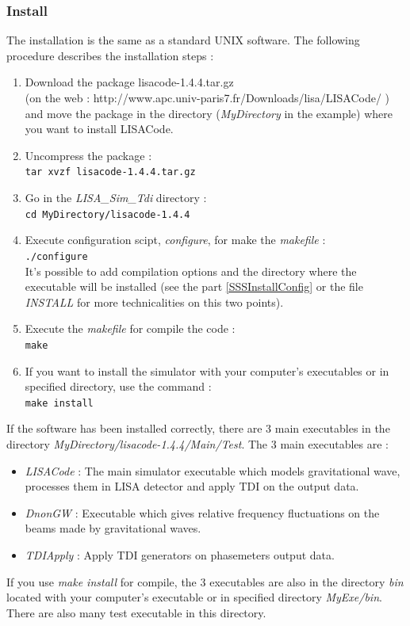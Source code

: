\documentclass[a4paper,english,12pt]{article}
\begin{document}
\subsubsection{Install}
\label{SSSInstallUNIX}
The installation is the same as a standard UNIX software. The following procedure describes the installation steps : 
\begin{enumerate}
\item Download the package lisacode-1.4.4.tar.gz\\ (on the web : http://www.apc.univ-paris7.fr/Downloads/lisa/LISACode/ )\\ and move the package in the directory ({\it MyDirectory} in the example) where you want to install LISACode.
\item Uncompress the package : \\
\hphantom{aaaaa}\texttt{tar xvzf lisacode-1.4.4.tar.gz }\\
\item Go in the {\it LISA\_Sim\_Tdi} directory :\\
\hphantom{aaaaa}\texttt{cd MyDirectory/lisacode-1.4.4 }\\
\item Execute configuration scipt, {\it configure}, for make the {\it makefile} : \\
\hphantom{aaaaa}\texttt{./configure}\\
It's possible to add  compilation options and the directory where the executable will be installed (see the part \ref{SSSInstallConfig} or the file {\it INSTALL} for more technicalities on this two points).
\item Execute the {\it makefile} for compile the code : \\
\hphantom{aaaaa}\texttt{make}
\item If you want to install the simulator with your computer's executables or in specified directory, use the command : \\
\hphantom{aaaaa}\texttt{make install}
\end{enumerate}

If the software has been installed correctly, there are 3 main executables in the directory {\it MyDirectory/lisacode-1.4.4/Main/Test}. The 3 main executables are :
\begin{itemize}
\item {\em LISACode} : The main simulator executable which models gravitational wave, processes them in LISA detector and apply TDI on the output data.
\item {\em DnonGW} : Executable which gives relative frequency fluctuations on the beams made by gravitational waves.
\item {\em TDIApply} : Apply TDI generators on phasemeters output data.
\end{itemize}
If you use {\it make install} for compile, the 3 executables are also in the directory {\it bin} located with your computer's executable or in specified directory {\it MyExe/bin}. There are also many test executable in this directory.\\
\end{document}

